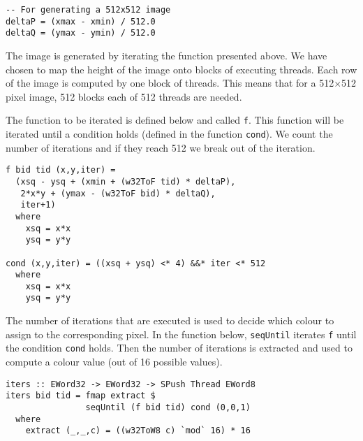 \begin{small}
\begin{verbatim} 
-- For generating a 512x512 image
deltaP = (xmax - xmin) / 512.0
deltaQ = (ymax - ymin) / 512.0
\end{verbatim}
\end{small} 

The image is generated by iterating the function presented above.
We have chosen to map the 
height of the image onto blocks of executing threads. Each row of the
image is computed by one block of threads. This means that for a 512$\times$512 
pixel image, 512 blocks each of 512 threads are needed. 

The function to be iterated is defined below and called {\tt f}. This 
function will be iterated until a condition holds (defined in the function 
{\tt cond}). We count the number of iterations and if they reach 512 we 
break out of the iteration. 

\begin{small} 
\begin{verbatim} 
f bid tid (x,y,iter) = 
  (xsq - ysq + (xmin + (w32ToF tid) * deltaP),
   2*x*y + (ymax - (w32ToF bid) * deltaQ),
   iter+1) 
  where
    xsq = x*x
    ysq = y*y

cond (x,y,iter) = ((xsq + ysq) <* 4) &&* iter <* 512  
  where
    xsq = x*x
    ysq = y*y 

\end{verbatim} 
\end{small} 

The number of iterations that are executed is used to decide
which colour to assign to the corresponding pixel. In the function below,
{\tt seqUntil} iterates {\tt f} until the condition {\tt cond} 
holds. Then the number of iterations is extracted and used to compute 
a colour value (out of 16 possible values). 


\begin{small} 
\begin{verbatim} 
iters :: EWord32 -> EWord32 -> SPush Thread EWord8
iters bid tid = fmap extract $
                seqUntil (f bid tid) cond (0,0,1)
  where
    extract (_,_,c) = ((w32ToW8 c) `mod` 16) * 16
\end{verbatim}
\end{small}

